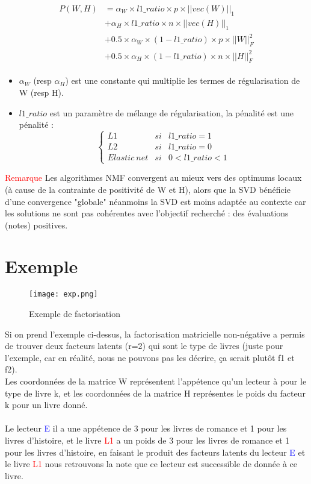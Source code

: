 \documentclass[12pt,letterpaper,twocolumn]{article}
\begin{document}
\begin{align*}\begin{aligned}
P(W, H) &= \alpha_W \times l1\_ratio \times p \times ||vec(W)||_1\\
&+ \alpha_H \times l1\_ratio \times n \times ||vec(H)||_1\\
&+ 0.5 \times \alpha_W \times (1 - l1\_ratio) \times p \times ||W||_{F}^2\\
&+ 0.5 \times \alpha_H \times (1 - l1\_ratio) \times n \times ||H||_{F}^2
\end{aligned}\end{align*}
  

\begin{itemize}[label=\textbullet ]
    \item $\alpha_W$ (resp $\alpha_H$) est une constante qui multiplie les termes de régularisation de W (resp H).
    \item $l1\_ratio$ est un paramètre de mélange de régularisation, la pénalité est une pénalité : $$  \left\{\begin{matrix}
 L1 & si & l1\_ratio=1\\ 
 L2 & si & l1\_ratio=0 \\
 Elastic~net & si & 0<l1\_ratio<1 
\end{matrix}\right. $$
\end{itemize}


\textcolor{red}{Remarque} Les algorithmes NMF convergent au mieux vers des optimums locaux (à cause de la contrainte de positivité de W et H), alors que la SVD bénéficie d’une convergence "globale" néanmoins la SVD est moins adaptée au contexte car les solutions ne sont pas cohérentes avec l’objectif recherché : des évaluations (notes) positives. \\


\section{Exemple}
\justify  

\begin{figure}[!h]
\centering
\texttt{[image: exp.png]}
\caption{Exemple de factorisation}
\end{figure}

Si on prend l'exemple ci-dessus, la factorisation matricielle non-négative a permis de trouver deux facteurs latents (r=2) qui sont le type de livres (juste pour l'exemple, car en réalité, nous ne pouvons pas les décrire, ça serait plutôt f1 et f2).\\
Les coordonnées de la matrice W représentent l'appétence qu'un lecteur à pour le type de livre k, et les coordonnées de la matrice H représentes le poids du facteur k pour un livre donné. \\
\\
Le lecteur \textcolor{blue}{E} il a une appétence de 3 pour les livres de romance et 1 pour les livres d'histoire, et le livre \textcolor{red}{L1} a un poids de 3 pour les livres de romance et 1 pour les livres d'histoire, en faisant le produit des facteurs latents du lecteur \textcolor{blue}{E} et le livre \textcolor{red}{L1} nous retrouvons la note que ce lecteur est successible de donnée à ce livre.
\end{document}
